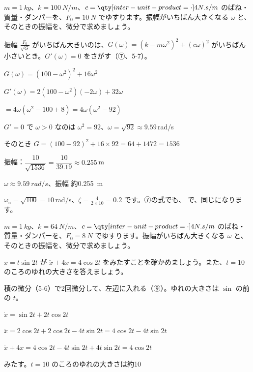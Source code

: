 \begin{reidai}[いちばん大きくゆれる角振動数]
$m=\qty{1}{kg}$、$k=\qty{100}{N/m}$、$c=\bkvinNsm{4}$ のばね・質量・ダンパーを、$F_0=\qty{10}{N}$ でゆすります。振幅がいちばん大きくなる $\omega$ と、そのときの振幅を、微分で求めましょう。\par
\kangaekata 振幅 $\frac{F_0}{\sqrt{G}}$ がいちばん大きいのは、$G(\omega)=(k-m\omega^2)^2+(c\omega)^2$ がいちばん小さいとき。$G'(\omega)=0$ をさがす（⑦、5-7）。\par
\shiki $G(\omega)=(100-\omega^2)^2+16\omega^2$\par
\bkvinq $G'(\omega)=2(100-\omega^2)(-2\omega)+32\omega$\par
\bkvinq \phantom{$G'(\omega)$}${}=4\omega(\omega^2-100+8)=4\omega(\omega^2-92)$\par
\bkvinq $G'=0$ で $\omega>0$ なのは $\omega^2=92$、$\omega=\sqrt{92}\approx9.59$\,rad/s\par
\bkvinq そのとき $G=(100-92)^2+16\times92=64+1472=1536$\par
\bkvinq 振幅：$\dfrac{10}{\sqrt{1536}}=\dfrac{10}{39.19}\approx0.255$\,m\par
\kotae $\omega\approx\qty{9.59}{rad/s}$、振幅 約\qty{0.255}{m}
\end{reidai}
$\omega_{\mathrm n}=\sqrt{100}=10$\,rad/s、$\zeta=\frac{4}{2\times10}=0.2$ です。⑦の式でも、
で、同じになります。

\begin{jibun}
$m=\qty{1}{kg}$、$k=\qty{64}{N/m}$、$c=\bkvinNsm{4}$ のばね・質量・ダンパーを、$F_0=\qty{8}{N}$ でゆすります。振幅がいちばん大きくなる $\omega$ と、そのときの振幅を、微分で求めましょう。
\end{jibun}

\begin{reidai}[ふえ続けるゆれを確かめる]
$x=t\sin2t$ が $\ddot x+4x=4\cos2t$ をみたすことを確かめましょう。また、$t=10$ のころのゆれの大きさを答えましょう。\par
\kangaekata 積の微分（5-6）で2回微分して、左辺に入れる（⑨）。ゆれの大きさは $\sin$ の前の $t$。\par
\shiki $\dot x=\sin2t+2t\cos2t$\par
\bkvinq $\ddot x=2\cos2t+2\cos2t-4t\sin2t=4\cos2t-4t\sin2t$\par
\bkvinq $\ddot x+4x=4\cos2t-4t\sin2t+4t\sin2t=4\cos2t$\par
\kotae みたす。$t=10$ のころのゆれの大きさは約10
\end{reidai}

